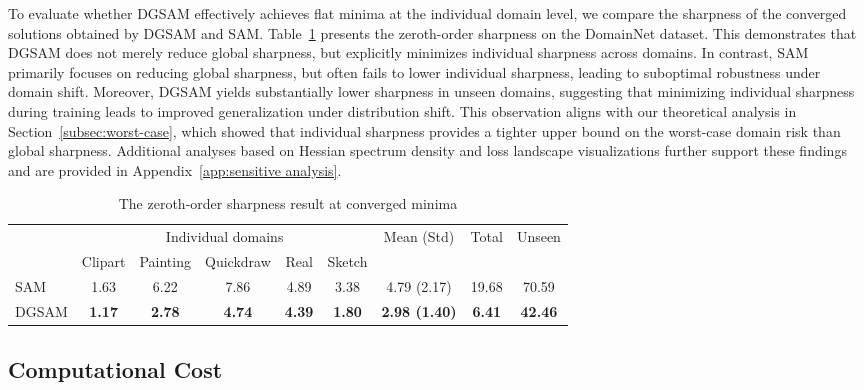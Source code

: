 \documentclass{article}
\theoremstyle{plain}
\theoremstyle{definition}
\theoremstyle{remark}
\begin{document}
To evaluate whether DGSAM effectively achieves flat minima at the individual domain level, we compare the sharpness of the converged solutions obtained by DGSAM and SAM. Table~\ref{tab:zeroth_sharpness} presents the zeroth-order sharpness on the DomainNet dataset. This demonstrates that DGSAM does not merely reduce global sharpness, but explicitly minimizes individual sharpness across domains. In contrast, SAM primarily focuses on reducing global sharpness, but often fails to lower individual sharpness, leading to suboptimal robustness under domain shift. Moreover, DGSAM yields substantially lower sharpness in unseen domains, suggesting that minimizing individual sharpness during training leads to improved generalization under distribution shift. This observation aligns with our theoretical analysis in Section~\ref{subsec:worst-case}, which showed that individual sharpness provides a tighter upper bound on the worst-case domain risk than global sharpness. Additional analyses based on Hessian spectrum density and loss landscape visualizations further support these findings and are provided in Appendix~\ref{app:sensitive analysis}.

\begin{table}[h!]
\footnotesize
\centering\captionsetup{justification=centering, skip=5pt}
\caption{The zeroth-order sharpness result at converged minima}
\setlength{\tabcolsep}{3.5pt} %
\begin{tabular}{l@{}cccccccc}
\toprule
 & \multicolumn{5}{c}{Individual domains} & \multirow{2}{*}{Mean (Std)} & \multirow{2}{*}{Total} & \multirow{2}{*}{Unseen} \\
 & Clipart & Painting & Quickdraw & Real & Sketch &  &  &  \\ \midrule
SAM    & 1.63    & 6.22     & 7.86      & 4.89 & 3.38   & 4.79 (2.17)   & 19.68 & 70.59 \\
DGSAM  & \textbf{1.17} & \textbf{2.78} & \textbf{4.74} & \textbf{4.39} & \textbf{1.80}   & \textbf{2.98 (1.40)}   & \textbf{6.41} & \textbf{42.46} \\ \bottomrule
\end{tabular}
\label{tab:zeroth_sharpness}
\end{table}

\subsection{Computational Cost}
\end{document}
